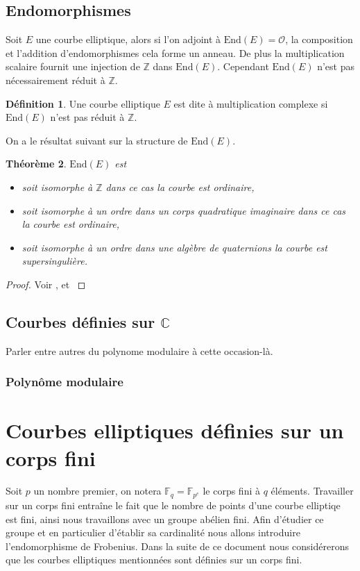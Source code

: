 \documentclass[10pt,a4paper]{book}
\theoremstyle{plain}
\newtheorem{thm}{Théorème}[chapter]
\theoremstyle{definition}
\theoremstyle{definition}
\theoremstyle{definition}
\theoremstyle{definition}
\newtheorem{defi}[thm]{Définition}
\theoremstyle{remark}
\theoremstyle{remark}
\theoremstyle{definition}
\begin{document}
\subsection{Endomorphismes}

Soit $E$ une courbe elliptique, alors si l'on adjoint à $\mathrm{End}(E)=\mathcal{O}$, la composition et l'addition d'endomorphismes cela forme un anneau. De plus la multiplication scalaire fournit une injection de $\mathbb{Z}$ dans $\mathrm{End}(E)$. Cependant $\mathrm{End}(E)$ n'est pas nécessairement réduit à $\mathbb{Z}$.

\begin{defi}
Une courbe elliptique $E$ est dite à multiplication complexe si $\mathrm{End}(E)$ n'est pas réduit à $\mathbb{Z}$.
\end{defi}
On a le résultat suivant sur la structure de $\mathrm{End}(E)$.

\begin{thm}
$\mathrm{End}(E)$ est
\begin{itemize}
\item soit isomorphe à $\mathbb{Z}$ dans ce cas la courbe est \emph{ordinaire}, 
\item soit isomorphe à un ordre dans un corps quadratique imaginaire dans ce cas la courbe est \emph{ordinaire}, 
\item soit isomorphe à un ordre dans une algèbre de quaternions la courbe est \emph{supersingulière}. 
\end{itemize}
\end{thm}

\begin{proof}
Voir \cite[Corollary III.9.4]{Silv1}, et \cite[Theorem V.3.1]{Silv1}
\end{proof}

\subsection{Courbes d\'efinies sur $\mathbb{C}$}
Parler entre autres du polynome modulaire à cette occasion-là.
\subsubsection{Polynôme modulaire}


\section{Courbes elliptiques définies sur un corps fini}

Soit $p$ un nombre premier, on notera $\mathbb{F}_q=\mathbb{F}_{p^e}$ le corps fini à $q$ éléments. Travailler sur un corps fini entraîne le fait que le nombre de points d'une courbe elliptiqe est fini, ainsi nous travaillons avec un groupe abélien fini. Afin d'étudier ce groupe et en particulier d'établir sa cardinalité nous allons introduire l'endomorphisme de Frobenius. Dans la suite de ce document nous considérerons que les courbes elliptiques mentionnées sont définies sur un corps fini.
\end{document}
